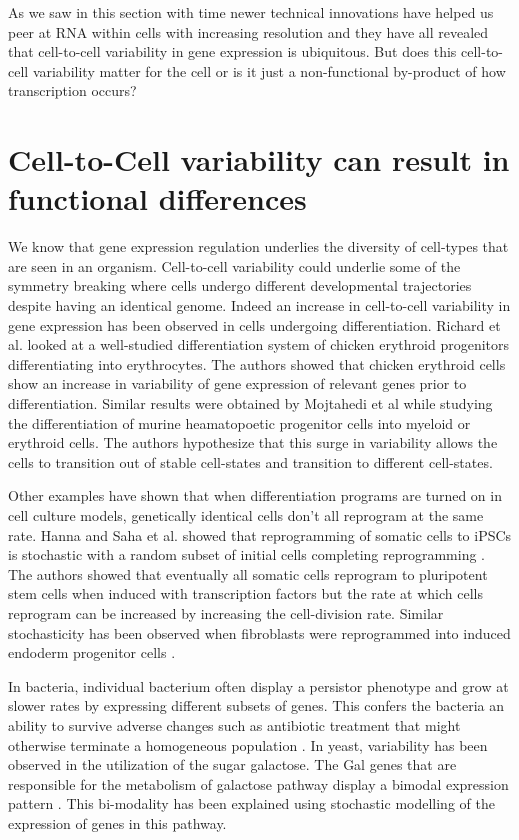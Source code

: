 As we saw in this section with time newer technical innovations have helped us peer at RNA within cells with increasing resolution and they have all revealed that cell-to-cell variability in gene expression is ubiquitous. But does this cell-to-cell variability matter for the cell or is it just a non-functional by-product of how transcription occurs?

\section{Cell-to-Cell variability can result in functional differences}

We know that gene expression regulation underlies the diversity of cell-types that are seen in an organism. Cell-to-cell variability could underlie some of the symmetry breaking where cells undergo different developmental trajectories despite having an identical genome. Indeed an increase in cell-to-cell variability in gene expression has been observed in cells undergoing differentiation. Richard et al.  \cite{richard_single-cell-based_2016} looked at a well-studied differentiation system of chicken erythroid progenitors differentiating into erythrocytes. The authors showed that chicken erythroid cells show an increase in variability of gene expression of relevant genes prior to differentiation. Similar results were obtained by Mojtahedi et al  \cite{mojtahedi_cell_2016} while studying the differentiation of murine heamatopoetic progenitor cells into myeloid or erythroid cells. The authors hypothesize that this surge in variability allows the cells to transition out of stable cell-states and transition to different cell-states. 

Other examples have shown that when differentiation programs are turned on in cell culture models, genetically identical cells don't all reprogram at the same rate. Hanna and Saha et al. showed that reprogramming of somatic cells to iPSCs is stochastic with a random subset of initial cells completing reprogramming  \cite{hanna_direct_2009}. The authors showed that eventually all somatic cells reprogram to pluripotent stem cells when induced with transcription factors but the rate at which cells reprogram can be increased by increasing the cell-division rate. Similar stochasticity has been observed when fibroblasts were reprogrammed into induced endoderm progenitor cells \cite{biddy_single-cell_2018}.

In bacteria, individual bacterium often display a persistor phenotype and grow at slower rates by expressing different subsets of genes. This confers the bacteria an ability to survive adverse changes such as antibiotic treatment that might otherwise terminate a homogeneous population \cite{veening_bet-hedging_2008}. In yeast, variability has been observed in the utilization of the sugar galactose. The Gal genes that are responsible for the metabolism of galactose pathway display a bimodal expression pattern \cite{acar_enhancement_2005}. This bi-modality has been explained using stochastic modelling of the expression of genes in this pathway. 

